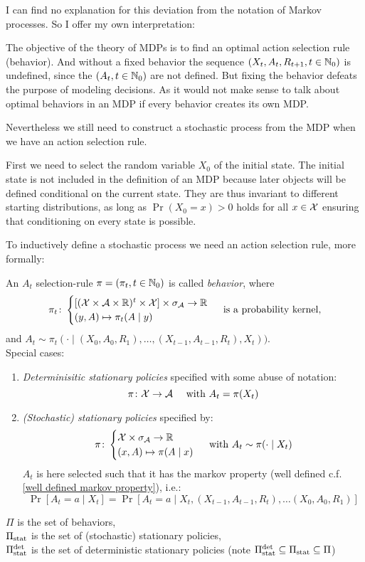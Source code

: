 I can find no explanation for this deviation from the notation of Markov processes. So I offer my own interpretation:

The objective of the theory of MDPs is to find an optimal action selection rule (behavior). And without a fixed behavior the sequence \((X_t, A_t, R_{t+1}, t\in\mathbb{N}_0 )\) is undefined, since the \((A_t,t\in\mathbb{N}_0)\) are not defined. But fixing the behavior defeats the purpose of modeling decisions. As it would not make sense to talk about optimal behaviors in an MDP if every behavior creates its own MDP.\vspace{1\baselineskip} 

Nevertheless we still need to construct a stochastic process from the MDP when we have an action selection rule. 

First we need to select the random variable \(X_0\) of the initial state. The initial state is not included in the definition of an MDP because later objects will be defined conditional on the current state. They are thus invariant to different starting distributions, as long as \(\Pr(X_0=x)>0\) holds for all \(x\in\mathcal{X}\) ensuring that conditioning on every state is possible.

To inductively define a stochastic process we need an action selection rule, more formally:

\begin{definition} An \(A_t\) selection-rule \(\pi=(\pi_t,t\in\mathbb{N}_0)\) is called \emph{behavior}, where
	\[ 
		\pi_t\colon
		\begin{cases}
			[(\mathcal{X}\times\mathcal{A}\times\mathbb{R})^t\times\mathcal{X}]\times\sigma_{\mathcal{A}} \to \mathbb{R} \\
			(y,A)\mapsto \pi_t(A\mid y)
		\end{cases} \text{ is a probability kernel,}
	\]
	and \(A_t\sim \pi_t(\cdot\mid (X_0,A_0,R_1), \dots,(X_{t-1},A_{t-1},R_t),X_t))\).\\
	Special cases:
	\begin{enumerate}
		\item \emph{Determinisitic stationary policies} specified with some abuse of notation:
		\[\leavevmode \pi\colon\cX\to\cA \quad\text{ with }A_t=\pi(X_t)\]
		\item \emph{(Stochastic) stationary policies} specified by:
		\[\pi\colon \begin{cases}
		\mathcal{X}\times\sigma_{\mathcal{A}}\to\mathbb{R}\\
		(x,A)\mapsto \pi(A\mid x)
		\end{cases} \text{ with } A_t\sim\pi(\cdot\mid X_t) 
		\]
		\(A_t\) is here selected such that it has the markov property (well defined c.f. \ref{well defined markov property}), i.e.:
		\[\Pr[A_t=a\mid X_t]=\Pr[A_t=a\mid X_t, (X_{t-1},A_{t-1},R_t), \dots (X_0,A_0,R_1)] \]
	\end{enumerate}
	\(\Pi\) is the set of behaviors,\\
	\(\Pi_{\textnormal{stat}}\) is the set of (stochastic) stationary policies, \\
	\(\Pi_{\textnormal{stat}}^{\textnormal{det}}\) is the set of deterministic stationary policies (note \(\Pi_{\textnormal{stat}}^{\textnormal{det}}\subseteq\Pi_{\textnormal{stat}}\subseteq \Pi \))
\end{definition}

